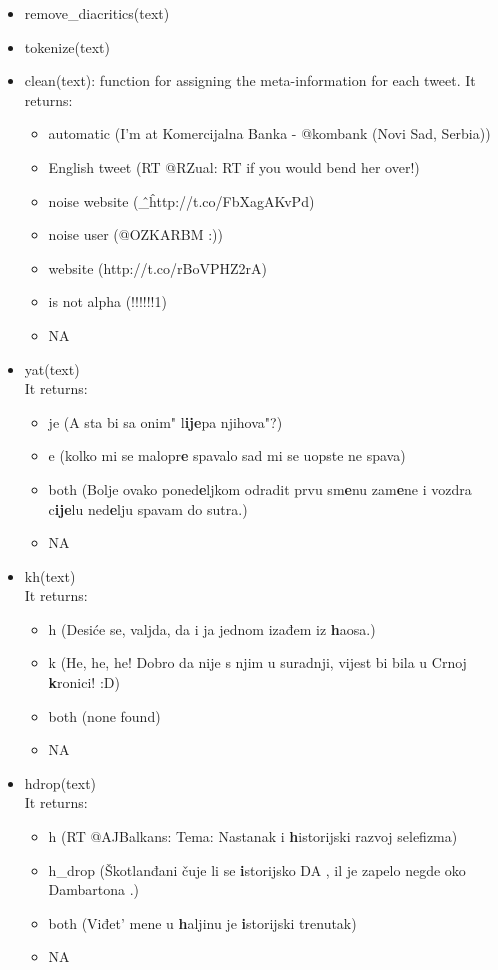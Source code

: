 \documentclass[a4paper]{article}
\begin{document}
\begin{itemize}
\item remove\_diacritics(text)
\item tokenize(text)
\item clean(text): function for assigning the meta-information for each tweet. 
It returns:
\begin{itemize}
\item automatic (I'm at Komercijalna Banka - @kombank (Novi Sad, Serbia))
\item English tweet (RT @RZual: RT if you would bend her over!)
\item noise website (\^\_\^ http://t.co/FbXagAKvPd)
\item noise user (@OZKARBM :))
\item website (http://t.co/rBoVPHZ2rA)
\item is not alpha (!!!!!!1)
\item NA %
\end{itemize}

\item yat(text)\\
It returns:
\begin{itemize}
\item je (A sta bi sa onim" l\textbf{ije}pa njihova"?)
\item e (kolko mi se malopr\textbf{e} spavalo sad mi se uopste ne spava)
\item both (Bolje ovako poned\textbf{e}ljkom odradit prvu sm\textbf{e}nu zam\textbf{e}ne i vozdra c\textbf{ije}lu ned\textbf{e}lju spavam do sutra.)
\item NA
\end{itemize}

\item kh(text)\\
It returns:
\begin{itemize}
\item h (Desiće se, valjda, da i ja jednom izađem iz \textbf{h}aosa.)
\item k (He, he, he! Dobro da nije s njim u suradnji, vijest bi bila u Crnoj \textbf{k}ronici! :D)
\item both (none found)
\item NA
\end{itemize}

\item hdrop(text)\\
It returns:
\begin{itemize}
\item h (RT @AJBalkans: Tema: Nastanak i \textbf{h}istorijski razvoj selefizma)
\item h\_drop (Škotlanđani čuje li se \textbf{i}storijsko DA , il je zapelo negde oko Dambartona .)
\item both (Viđet' mene u \textbf{h}aljinu je \textbf{i}storijski trenutak)
\item NA
\end{itemize}


\end{itemize}
\end{document}
